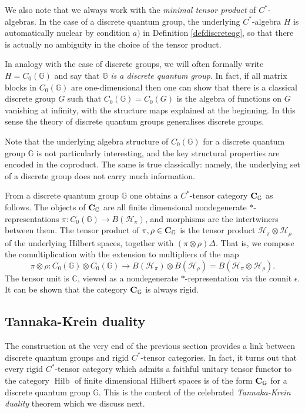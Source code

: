 \documentclass[a4paper]{amsart}
\newcommand*{\Hc}{\mathcal{H}}
\newcommand*{\BC}{{\bf C}}
\newcommand{\GG}{\mathbb{G}}
\DeclareMathOperator{\Hilb}{Hilb}
\numberwithin{equation}{section}
\theoremstyle{change}
\begin{document}
We also note that we always work with the \emph{minimal tensor product} of $ C^* $-algebras. In the case of a discrete quantum group, the underlying $ C^* $-algebra $ H $ is automatically nuclear by condition $ a) $ in Definition \ref{defdiscreteqg}, so that there is actually no ambiguity in the choice of the tensor product.

In analogy with the case of discrete groups, we will often formally write $ H = C_0(\GG) $ and say that $ \GG $ \emph{is a discrete quantum group}. 
In fact, if all matrix blocks in $ C_0(\GG) $ are one-dimensional then one can show that there is a classical discrete group $ G $ 
such that $ C_0(\GG) = C_0(G) $ is the algebra of functions on $ G $ vanishing at infinity, with the structure maps explained at the beginning. In this sense the theory of discrete quantum groups generalises discrete groups. 

Note that the underlying algebra structure of $ C_0(\GG) $ for a discrete quantum group $ \GG $ is not particularly interesting, and the key structural properties are encoded in the coproduct. The same is true classically: namely, the underlying set of a discrete group does not carry much information. 

From a discrete quantum group $ \GG $ one obtains a $ C^* $-tensor category $ \BC_\GG $ as follows. The objects of $ \BC_\GG $ are all finite dimensional nondegenerate $ * $-representations $ \pi: C_0(\GG) \rightarrow B(\Hc_\pi) $, and morphisms are the intertwiners between them. 
The tensor product of $ \pi, \rho \in \BC_\GG $ is the tensor product $ \Hc_\pi \otimes \Hc_\rho $ of the underlying Hilbert spaces, together with $ (\pi \otimes \rho) \Delta $. That is, we compose the comultiplication with the extension to multipliers of the map 
$$ 
\pi \otimes \rho: C_0(\GG) \otimes C_0(\GG) \rightarrow B(\Hc_\pi) \otimes B(\Hc_\rho) = B(\Hc_\pi \otimes \Hc_\rho).  
$$ 
The tensor unit is $ \mathbb{C} $, viewed as a nondegenerate $ * $-representation via the counit $ \epsilon $. 
It can be shown that the category $ \BC_\GG $ is always rigid. 


\subsection{Tannaka-Krein duality} 

The construction at the very end of the previous section provides 
a link between discrete quantum groups and rigid $ C^* $-tensor categories. In fact, it turns out that every rigid $ C^* $-tensor category which admits a faithful unitary tensor functor 
to the category $ \Hilb $ of finite dimensional Hilbert spaces is of the form $ \BC_\GG $ for a discrete quantum group $ \GG $. 
This is the content of the celebrated \emph{Tannaka-Krein duality} theorem which we discuss next. 
\end{document}
